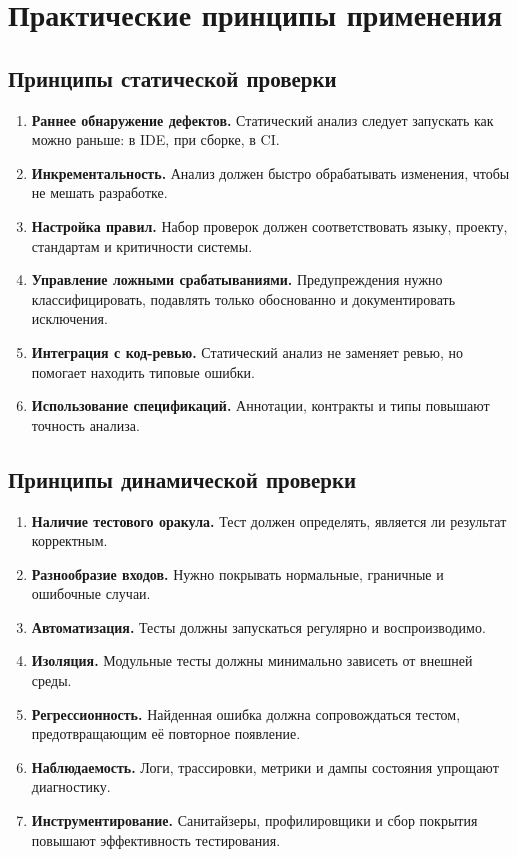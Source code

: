 \documentclass[12pt,a4paper]{article}
\begin{document}
\section{Практические принципы применения}

\subsection{Принципы статической проверки}

\begin{enumerate}
  \item \textbf{Раннее обнаружение дефектов.} Статический анализ следует запускать как можно раньше: в IDE, при сборке, в CI.
  \item \textbf{Инкрементальность.} Анализ должен быстро обрабатывать изменения, чтобы не мешать разработке.
  \item \textbf{Настройка правил.} Набор проверок должен соответствовать языку, проекту, стандартам и критичности системы.
  \item \textbf{Управление ложными срабатываниями.} Предупреждения нужно классифицировать, подавлять только обоснованно и документировать исключения.
  \item \textbf{Интеграция с код-ревью.} Статический анализ не заменяет ревью, но помогает находить типовые ошибки.
  \item \textbf{Использование спецификаций.} Аннотации, контракты и типы повышают точность анализа.
\end{enumerate}

\subsection{Принципы динамической проверки}

\begin{enumerate}
  \item \textbf{Наличие тестового оракула.} Тест должен определять, является ли результат корректным.
  \item \textbf{Разнообразие входов.} Нужно покрывать нормальные, граничные и ошибочные случаи.
  \item \textbf{Автоматизация.} Тесты должны запускаться регулярно и воспроизводимо.
  \item \textbf{Изоляция.} Модульные тесты должны минимально зависеть от внешней среды.
  \item \textbf{Регрессионность.} Найденная ошибка должна сопровождаться тестом, предотвращающим её повторное появление.
  \item \textbf{Наблюдаемость.} Логи, трассировки, метрики и дампы состояния упрощают диагностику.
  \item \textbf{Инструментирование.} Санитайзеры, профилировщики и сбор покрытия повышают эффективность тестирования.
\end{enumerate}
\end{document}
